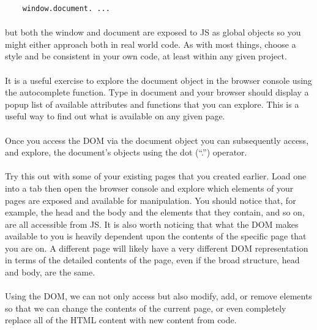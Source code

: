 \begin{lstlisting}
	window.document. ...
\end{lstlisting}

\paragraph{} but both the window and document are exposed to JS as global objects so you might either approach both in real world code. As with most things, choose a style and be consistent in your own code, at least within any given project.
\paragraph{} It is a useful exercise to explore the document object in the browser console using the autocomplete function. Type in document and your browser should display a popup list of available attributes and functions that you can explore. This is a useful way to find out what is available on any given page.
\paragraph{} Once you access the DOM via the document object you can subsequently access, and explore, the document’s objects using the dot (“.”) operator.
\paragraph{} Try this out with some of your existing pages that you created earlier. Load one into a tab then open the browser console and explore which elements of your pages are exposed and available for manipulation. You should notice that, for example, the head and the body and the elements that they contain, and so on, are all accessible from JS. It is also worth noticing that what the DOM makes available to you is heavily dependent upon the contents of the specific page that you are on. A different page will likely have a very different DOM representation in terms of the detailed contents of the page, even if the broad structure, head and body, are the same. 
\paragraph{} Using the DOM, we can not only access but also modify, add, or remove elements so that we can change the contents of the current page, or even completely replace all of the HTML content with new content from code.



